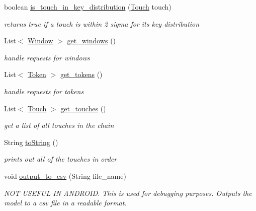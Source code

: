 \begin{DoxyCompactItemize}
boolean \hyperlink{classcomponents_1_1_chain_a8bb0e379e0102b0443c38ef174fe83cc}{is\+\_\+touch\+\_\+in\+\_\+key\+\_\+distribution} (\hyperlink{classcomponents_1_1_touch}{Touch} touch)
\begin{DoxyCompactList}\small\item\em returns true if a touch is within 2 sigma for it\textquotesingle{}s key distribution \end{DoxyCompactList}\item 
List$<$ \hyperlink{classcomponents_1_1_window}{Window} $>$ \hyperlink{classcomponents_1_1_chain_a48f2e0718eb4a400c6ceb23afb0ea162}{get\+\_\+windows} ()
\begin{DoxyCompactList}\small\item\em handle requests for windows \end{DoxyCompactList}\item 
List$<$ \hyperlink{classcomponents_1_1_token}{Token} $>$ \hyperlink{classcomponents_1_1_chain_aed8e3b1ca179438db491b35a2eee822b}{get\+\_\+tokens} ()
\begin{DoxyCompactList}\small\item\em handle requests for tokens \end{DoxyCompactList}\item 
List$<$ \hyperlink{classcomponents_1_1_touch}{Touch} $>$ \hyperlink{classcomponents_1_1_chain_affd01133384c5cb222448c76ab0a82fb}{get\+\_\+touches} ()
\begin{DoxyCompactList}\small\item\em get a list of all touches in the chain \end{DoxyCompactList}\item 
String \hyperlink{classcomponents_1_1_chain_ac5496e565687d95b78cbc2d34bbb2ba2}{to\+String} ()
\begin{DoxyCompactList}\small\item\em prints out all of the touches in order \end{DoxyCompactList}\item 
void \hyperlink{classcomponents_1_1_chain_acf107be5a3d4e0dc151f07e0c519f698}{output\+\_\+to\+\_\+csv} (String file\+\_\+name)
\begin{DoxyCompactList}\small\item\em N\+OT U\+S\+E\+F\+UL IN A\+N\+D\+R\+O\+ID. This is used for debugging purposes. Outputs the model to a csv file in a readable format. \end{DoxyCompactList}\end{DoxyCompactItemize}


